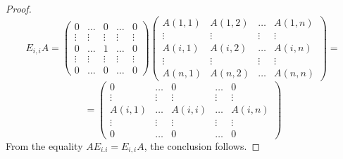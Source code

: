 \documentclass[10pt,a4paper]{amsart}
\begin{document}
\begin{proof}
$$ E_{i,i} A = 
\begin{pmatrix}
0 & \dots & 0 & \dots & 0\\
\vdots & \vdots & \vdots & \vdots & \vdots \\
0 & \dots &1 & \dots & 0\\
\vdots & \vdots & \vdots & \vdots & \vdots \\
0 & \dots & 0 & \dots & 0
\end{pmatrix}
\begin{pmatrix}
A(1,1) & A(1,2) & \dots & A(1,n) \\
\vdots & \vdots & \vdots & \vdots \\
A(i,1) & A(i,2) & \dots & A(i,n) \\
\vdots & \vdots & \vdots & \vdots \\
A(n,1) & A(n,2) & \dots & A(n,n) 
\end{pmatrix}
 = 
$$
$$ =
\begin{pmatrix}
0 & \dots & 0 & \dots & 0\\
\vdots & \vdots & \vdots & \vdots & \vdots\\
A(i,1) & \dots &A(i,i) & \dots & A(i,n)\\
\vdots & \vdots & \vdots & \vdots & \vdots \\
0 & \dots & 0 & \dots & 0
\end{pmatrix}
$$ 
From the equality $AE_{i.i} = E_{i,i} A$, the conclusion follows.
\end{proof}
\end{document}
